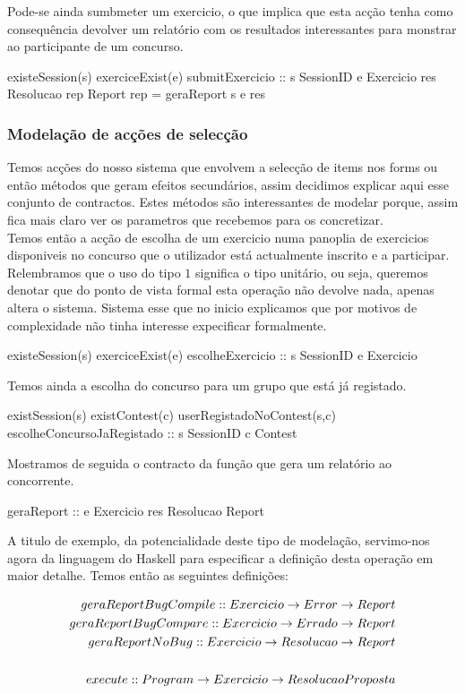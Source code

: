 Pode-se ainda sumbmeter um exercicio, o que implica que esta acção tenha como consequência devolver um relatório com os resultados interessantes para monstrar
ao participante de um concurso.

\prop
{ existeSession(s) \wedge exerciceExist(e) }
{ submitExercicio :: s \unif SessionID \rarrow e \unif Exercicio \rarrow res \unif Resolucao \rarrow rep \unif Report}
{ rep = geraReport s e res }

\subsubsection{Modelação de acções de selecção}
Temos acções do nosso sistema que envolvem a selecção de items nos forms ou então métodos que geram efeitos secundários, assim decidimos explicar aqui esse conjunto de
contractos. Estes métodos são interessantes de modelar porque, assim fica mais claro ver os parametros que recebemos para os concretizar.\\

Temos então a acção de escolha de um exercicio numa panoplia de exercicios disponiveis no concurso que o utilizador está actualmente inscrito e a participar.\\
Relembramos que o uso do tipo $1$ significa o tipo unitário, ou seja, queremos denotar que do ponto de vista formal esta operação não devolve nada, apenas altera o sistema.
Sistema esse que no inicio explicamos que por motivos de complexidade não tinha interesse expecificar formalmente.

\prop
{ existeSession(s) \wedge exerciceExist(e) }
{escolheExercicio :: s \unif SessionID \rarrow e \unif Exercicio }
{ }

Temos ainda a escolha do concurso para um grupo que está já registado.

\prop
{ existSession(s) \wedge existContest(c) \wedge userRegistadoNoContest(s,c) }
{escolheConcursoJaRegistado :: s \unif SessionID \rarrow c \unif Contest }
{ }

Mostramos de seguida o contracto da função que gera um relatório ao concorrente.

\prop
{ }
{geraReport :: e \unif Exercicio \rarrow res \unif Resolucao \rarrow Report}
{ }

A titulo de exemplo, da potencialidade deste tipo de modelação, servimo-nos agora da linguagem do Haskell para especificar a definição desta operação em maior detalhe.
Temos então as seguintes definições:

\begin{eqnarray*}
geraReportBugCompile :: Exercicio \rightarrow Error \rightarrow Report\\
geraReportBugCompare :: Exercicio \rightarrow Errado \rightarrow Report\\
geraReportNoBug :: Exercicio \rightarrow Resolucao \rightarrow Report\\
\\
execute :: Program \rightarrow Exercicio \rightarrow ResolucaoProposta\\
\end{eqnarray*}


